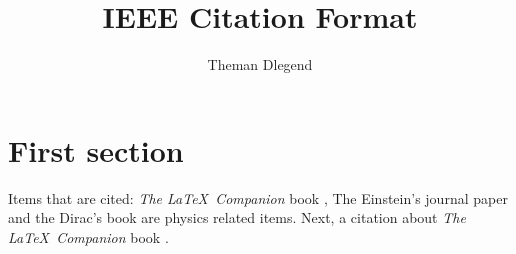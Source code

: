\documentclass{article}
\title{IEEE Citation Format}
\author{Theman Dlegend}
\begin{document}
\maketitle

\section{First section}

\lipsum
Items that are cited: \textit{The \LaTeX\ Companion} book \cite{latexcompanion}, The Einstein's journal paper \cite{einstein} and the Dirac's book \cite{dirac} are physics related items. Next, a citation about \textit{The \LaTeX\ Companion} book \cite{latexcompanion}.

\medskip


\end{document}
